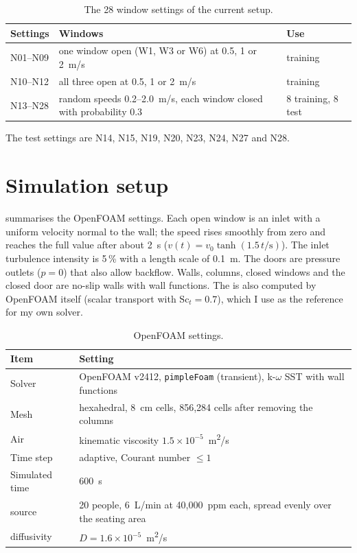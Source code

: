 \begin{table}[h]
  \centering
  \caption{The 28 window settings of the current setup.}
  \label{tab:settings}
  \begin{tabular}{l>{\raggedright}p{7.6cm}l}
    \toprule
    Settings & Windows & Use\\
    \midrule
    N01--N09 & one window open (W1, W3 or W6) at 0.5, 1 or 2~m/s & training\\
    N10--N12 & all three open at 0.5, 1 or 2~m/s & training\\
    N13--N28 & random speeds 0.2--2.0~m/s, each window closed with probability 0.3 & 8 training, 8 test\\
    \bottomrule
  \end{tabular}
\end{table}
The test settings are N14, N15, N19, N20, N23, N24, N27 and N28.

\section{Simulation setup}
 summarises the OpenFOAM settings. Each open window is an inlet with a uniform velocity normal
to the wall; the speed rises smoothly from zero and reaches the full value after about 2~s
($v(t)=v_0\tanh(1.5\,t/\mathrm{s})$). The
inlet turbulence intensity is 5\,\% with a length scale of 0.1~m. The doors are pressure outlets ($p=0$) that
also allow backflow. Walls, columns, closed windows and the closed door are no-slip walls with wall functions.
The \cotwo{} is also computed by OpenFOAM itself (scalar transport with $\mathrm{Sc}_t=0.7$), which I use as
the reference for my own solver.

\begin{table}[h]
  \centering
  \caption{OpenFOAM settings.}
  \label{tab:sim}
  \begin{tabular}{>{\raggedright}p{4.2cm}p{9.5cm}}
    \toprule
    Item & Setting\\
    \midrule
    Solver & OpenFOAM v2412, \texttt{pimpleFoam} (transient), k-$\omega$ SST with wall functions\\
    Mesh & hexahedral, 8~cm cells, 856,284 cells after removing the columns\\
    Air & kinematic viscosity $1.5\times10^{-5}$~m\textsuperscript{2}/s\\
    Time step & adaptive, Courant number $\le 1$\\
    Simulated time & 600~s\\
    \cotwo{} source & 20 people, 6~L/min at 40,000~ppm each, spread evenly over the seating area\\
    \cotwo{} diffusivity & $D=1.6\times10^{-5}$~m\textsuperscript{2}/s\\
    \bottomrule
  \end{tabular}
\end{table}

